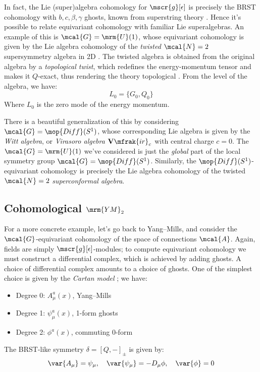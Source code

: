 \documentclass[a4paper
	,10pt
]{article}
\newcommand{\YM}{{\ensuremath{\mrm{YM}_2}}\xspace}
\newcommand{\Vir}{\mathbf{V}\mfrak{ir}}
\begin{document}
	In fact, the Lie (super)algebra cohomology for $\mscr{g}[\epsilon]$ is precisely the BRST cohomology with $b,c,\beta,\gamma$ ghosts, known from superstring theory \cite{Polchinski:1998rr,Cordes:1994fc}. 
	Hence it's possible to relate equivariant cohomology with familiar Lie superalgebras. 
	An example of this is $\mcal{G} = \mrm{U}(1)$, whose equivariant cohomology is given by the Lie algebra cohomology of the \textit{twisted} $\mcal{N} = 2$ supersymmetry algebra in 2D \cite{Cordes:1994fc}. The twisted algebra is obtained from the original algebra by a \textit{topological twist}, which redefines the energy-momentum tensor and makes it $Q$-exact, thus rendering the theory topological \cite{Witten:1991zz,MauricioStuff}. From the level of the algebra, we have:
	\begin{equation}
		L_0 = \{G_0, Q_0\}
	\end{equation}
	Where $L_0$ is the zero mode of the energy momentum. 
	
	There is a beautiful generalization of this by considering $\mcal{G} = \mop{Diff}(S^1)$, whose corresponding Lie algebra is given by the \textit{Witt algebra}, or \textit{Virasoro algebra} $\Vir_c$ with central charge $c=0$. The $\mcal{G} = \mrm{U}(1)$ we've considered is just the \textit{global} part of the local symmetry group $\mcal{G} = \mop{Diff}(S^1)$. Similarly, the $\mop{Diff}(S^1)$-equivariant cohomology is precisely the Lie algebra cohomology of the twisted $\mcal{N} = 2$ \textit{superconformal algebra}.
\subsection{Cohomological \YM}
	For a more concrete example, let's go back to Yang--Mills, and consider the $\mcal{G}$-equivariant cohomology of the space of connections $\mcal{A}$. Again, fields are simply $\mscr{g}[\epsilon]$-modules; to compute equivariant cohomology we must construct a differential complex, which is achieved by adding ghosts. A choice of differential complex amounts to a choice of ghosts. One of the simplest choice is given by the \textit{Cartan model} \cite{Witten:1990bs,Cordes:1994fc}; we have:
	\begin{itemize}[noitemsep]
	\item Degree 0: $A^a_\mu(x)$, Yang--Mills
	\item Degree 1: $\psi^a_\mu(x)$, 1-form ghosts
	\item Degree 2: $\phi^a(x)$, commuting 0-form
	\end{itemize}
	The BRST-like symmetry $\delta = [Q,-]_\pm$ is given by:
	\begin{equation}
		\var{A_\mu} = \psi_\mu,
	\quad
		\var{\psi_\mu} = -D_\mu \phi,
	\quad
		\var{\phi} = 0
	\end{equation}
	
\end{document}
